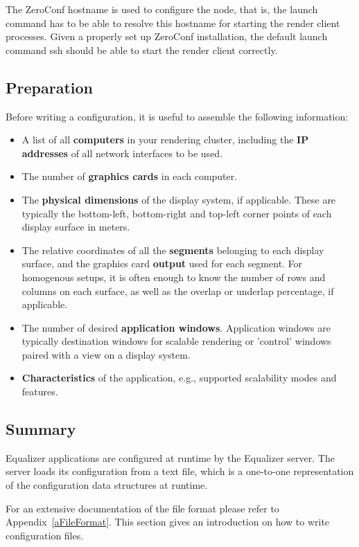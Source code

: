 \documentclass[10pt,a4]{scrartcl}
\newcommand{\aref}[1]{Appendix~\ref{#1}}
\begin{document}
The ZeroConf hostname is used to configure the node, that is, the launch command
has to be able to resolve this hostname for starting the render client
processes. Given a properly set up ZeroConf installation, the default launch
command \textsf{ssh} should be able to start the render client correctly.

\subsection{Preparation}

Before writing a configuration, it is useful to assemble the following
information:

\begin{itemize}
\item A list of all \textbf{computers} in your rendering cluster,
  including the \textbf{IP addresses} of all network interfaces to be
  used.
\item The number of \textbf{graphics cards} in each computer.
\item The \textbf{physical dimensions} of the display system, if
  applicable. These are typically the bottom-left, bottom-right and
  top-left corner points of each display surface in meters.
\item The relative coordinates of all the \textbf{segments} belonging to
  each display surface, and the graphics card \textbf{output} used for
  each segment. For homogenous setups, it is often enough to know the
  number of rows and columns on each surface, as well as the overlap or
  underlap percentage, if applicable.
\item The number of desired \textbf{application windows}. Application
  windows are typically destination windows for scalable rendering or
  'control' windows paired with a view on a display system.
\item \textbf{Characteristics} of the application, e.g., supported
  scalability modes and features.
\end{itemize}

\subsection{Summary}

Equalizer applications are configured at runtime by the Equalizer
server. The server loads its configuration from a text file, which is a
one-to-one representation of the configuration data structures at
runtime.

For an extensive documentation of the file format please refer to
\aref{aFileFormat}. This section gives an introduction on how to write
configuration files.
\end{document}
